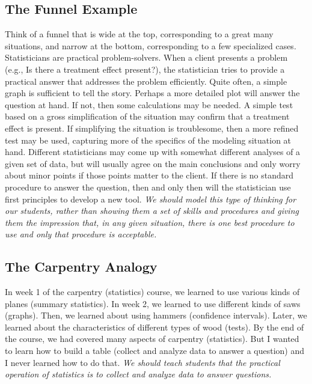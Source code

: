 \subsection{\textbf{The Funnel Example}} 
Think of a funnel that is wide at the top, corresponding to a great many situations, and narrow at the bottom, corresponding to a few specialized cases. Statisticians are practical problem-solvers.  When a client presents a problem (e.g., Is there a treatment effect present?), the statistician tries to provide a practical answer that addresses the problem efficiently. Quite often, a simple graph is sufficient to tell the story. Perhaps a more detailed plot will answer the question at hand. If not, then some calculations may be needed. A simple test based on a gross simplification of the situation may confirm that a treatment effect is present. If simplifying the situation is troublesome, then a more refined test may be used, capturing more of the specifics of the modeling situation at hand.  Different statisticians may come up with somewhat different analyses of a given set of data, but will usually agree on the main conclusions and only worry about minor points if those points matter to the client.  If there is no standard procedure to answer the question, then and only then  will the statistician use first principles to develop a new tool. \textit{We should model this type of thinking for our students, rather than showing them a set of skills and procedures and giving them the impression that, in any given situation, there is one best procedure to use and only that procedure is acceptable.}
 
\subsection{\textbf{The Carpentry Analogy}}
In week 1 of the carpentry (statistics) course, we learned to use various kinds of planes (summary statistics). In week 2, we learned to use different kinds of saws (graphs). Then, we learned about using hammers (confidence intervals). Later, we learned about the characteristics of different types of wood (tests). By the end of the course, we had covered many aspects of carpentry (statistics). But I wanted to learn how to build a table (collect and analyze data to answer a question) and I never learned how to do that. \textit{We should teach students that the practical operation of statistics is to collect and analyze data to answer questions.}

\vspace{.2in}
\noindent {}

